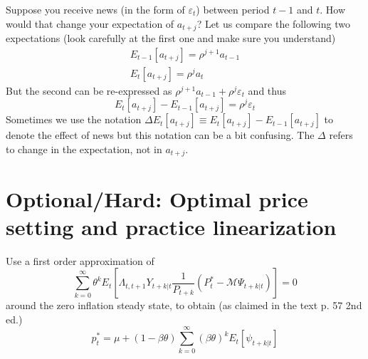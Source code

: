 \documentclass[authoryear,11pt]{elsarticle}
\begin{document}
Suppose you receive news (in the form of $\varepsilon_{t}$) between period $t-1$ and $t$. How would that change your expectation of $a_{t+j}$? Let us compare the following two expectations (look carefully at the first one and make sure you understand)
\begin{eqnarray*}
E_{t-1}[ a_{t+j} ] = \rho^{j+1} a_{t-1}	\\
E_{t} [ a_{t+j} ] = \rho^{j} a_{t}
\end{eqnarray*}
But the second can be re-expressed as $\rho^{j+1} a_{t-1} + \rho^{j} \varepsilon_{t}$ and thus
\[
E_{t} [ a_{t+j} ] - E_{t-1}[ a_{t+j} ] = \rho^{j}  \varepsilon_{t}
\]
Sometimes we use the notation $\Delta E_{t}[ a_{t+j} ] \equiv E_{t} [ a_{t+j} ] - E_{t-1}[ a_{t+j} ]$ to denote the effect of news but this notation can be a bit confusing. The $\Delta$ refers to change in the expectation, not in $a_{t+j}$.
%
%
%

\section{Optional/Hard: Optimal price setting and practice linearization}
Use a first order approximation of
\begin{equation}
\sum\limits_{k=0}^{\infty} \theta^{k} E_{t} \left[ \Lambda_{t,t+1} Y_{t+k|t} \frac{1}{P_{t+k}} \left( P_{t}^{\ast} - \mathcal{M}\Psi_{t+k|t} \right) \right] = 0\label{eqn:fwd_obj_fn}
\end{equation}
around the zero inflation steady state, to obtain (as claimed in the text p. 57 2nd ed.)
\[
p_{t}^{\ast} = \mu + (1-\beta \theta) \sum\limits_{k=0}^{\infty}(\beta \theta)^{k} E_{t}[\psi_{t+k|t}]
\]
\end{document}
